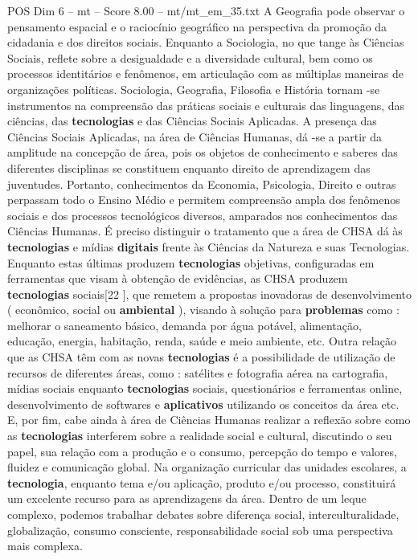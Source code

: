 \begin{textsample}{POS Dim 6 – mt – Score 8.00 – mt/mt\_em\_35.txt}
A Geografia pode observar o pensamento espacial e o raciocínio geográfico na perspectiva da promoção da cidadania e dos direitos sociais.
Enquanto a Sociologia, no que tange às Ciências Sociais, reflete sobre a desigualdade e a diversidade cultural, bem como os processos identitários e fenômenos, em articulação com as múltiplas maneiras de organizações políticas.
Sociologia, Geografia, Filosofia e História tornam -se instrumentos na compreensão das práticas sociais e culturais das linguagens, das ciências, das \textbf{tecnologias} e das Ciências Sociais Aplicadas.
A presença das Ciências Sociais Aplicadas, na área de Ciências Humanas, dá -se a partir da amplitude na concepção de área, pois os objetos de conhecimento e saberes das diferentes disciplinas se constituem enquanto direito de aprendizagem das juventudes.
Portanto, conhecimentos da Economia, Psicologia, Direito e outras perpassam todo o Ensino Médio e permitem compreensão ampla dos fenômenos sociais e dos processos tecnológicos diversos, amparados nos conhecimentos das Ciências Humanas.
É preciso distinguir o tratamento que a área de CHSA dá às \textbf{tecnologias} e mídias \textbf{digitais} frente às Ciências da Natureza e suas Tecnologias.
Enquanto estas últimas produzem \textbf{tecnologias} objetivas, configuradas em ferramentas que visam à obtenção de evidências, as CHSA produzem \textbf{tecnologias} sociais[22 ], que remetem a propostas inovadoras de desenvolvimento ( econômico, social ou \textbf{ambiental} ), visando à solução para \textbf{problemas} como : melhorar o saneamento básico, demanda por água potável, alimentação, educação, energia, habitação, renda, saúde e meio ambiente, etc.
Outra relação que as CHSA têm com as novas \textbf{tecnologias} é a possibilidade de utilização de recursos de diferentes áreas, como : satélites e fotografia aérea na cartografia, mídias sociais enquanto \textbf{tecnologias} sociais, questionários e ferramentas online, desenvolvimento de softwares e \textbf{aplicativos} utilizando os conceitos da área etc.
E, por fim, cabe ainda à área de Ciências Humanas realizar a reflexão sobre como as \textbf{tecnologias} interferem sobre a realidade social e cultural, discutindo o seu papel, sua relação com a produção e o consumo, percepção do tempo e valores, fluidez e comunicação global.
Na organização curricular das unidades escolares, a \textbf{tecnologia}, enquanto tema e/ou aplicação, produto e/ou processo, constituirá um excelente recurso para as aprendizagens da área.
Dentro de um leque complexo, podemos trabalhar debates sobre diferença social, interculturalidade, globalização, consumo consciente, responsabilidade social sob uma perspectiva mais complexa.

\end{textsample}
